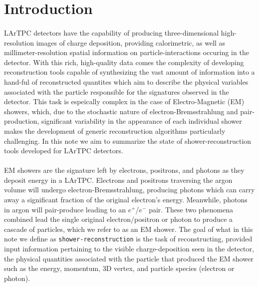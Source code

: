 
\section{Introduction}

\paragraph{}LArTPC detectors have the capability of producing three-dimensional high-resolution images of charge deposition, providing calorimetric, as well as millimeter-resolution spatial information on particle-interactions occuring in the detector. With this rich, high-quality data comes the complexity of developing reconstruction tools capable of synthesizing the vast amount of information into a hand-ful of reconstructed quantites which aim to describe the physical variables associated with the particle responsible for the signatures observed in the detector. This task is espeically complex in the case of Electro-Magnetic (EM) showers, which, due to the stochastic nature of electron-Bremsstrahlung and pair-production, significant variability in the appearance of each individual shower makes the development of generic reconstruction algorithms particularly challenging. In this note we aim to summarize the state of shower-reconstruction tools developed for LArTPC detectors.
\paragraph{}EM showers are the signature left by electrons, positrons, and photons as they deposit energy in a LArTPC. Electrons and positrons traversing the argon volume will undergo electron-Bremsstrahlung, producing photons which can carry away a significant fraction of the original electron's energy. Meanwhile, photons in argon will pair-produce leading to an $e^+$/$e^-$ pair. These two phenomena combined lead the single original electron/positron or photon to produce a cascade of particles, which we refer to as an EM shower. The goal of what in this note we define as \texttt{shower-reconstruction} is the task of reconstructing, provided input information pertaining to the visible charge-deposition seen in the detector, the physical quantities associated with the particle that produced the EM shower such as the energy, momentum, 3D vertex, and particle species (electron or photon).
